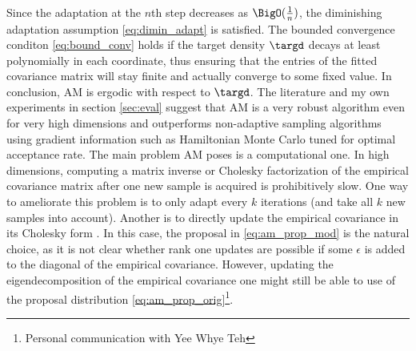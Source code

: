  Since the adaptation at the $n$th step decreases as $\BigO(\frac{1}{n})$, the diminishing adaptation assumption \eqref{eq:dimin_adapt} is satisfied. The bounded convergence conditon \eqref{eq:bound_conv} holds if the target density $\targd$ decays at least polynomially in each coordinate, thus ensuring that the entries of the fitted covariance matrix will stay finite and actually converge to some fixed value. In conclusion, AM is ergodic with respect to $\targd$. The literature \citep{Haario2001,Roberts2009} and my own experiments in section \ref{sec:eval} suggest that AM is a very robust algorithm even for very high dimensions and outperforms non-adaptive sampling algorithms using gradient information such as Hamiltonian Monte Carlo \citep{Neal2011} tuned for optimal acceptance rate. The main problem AM poses is a computational one. In high dimensions, computing a matrix inverse or Cholesky factorization of the empirical covariance matrix after one new sample is acquired is prohibitively slow. One way to ameliorate this problem is to only adapt every $k$ iterations (and take all $k$ new samples into account). Another is to directly update the empirical covariance in its Cholesky form \citep[see e.g. ][]{Rasmussen2006}. In this case, the proposal in \eqref{eq:am_prop_mod} is the natural choice, as it is not  clear whether rank one updates are possible if some $\epsilon$ is added to the diagonal of the empirical covariance. However, updating the eigendecomposition of the empirical covariance one might still be able to use of the proposal distribution \eqref{eq:am_prop_orig}\footnote{Personal communication with Yee Whye Teh}.

